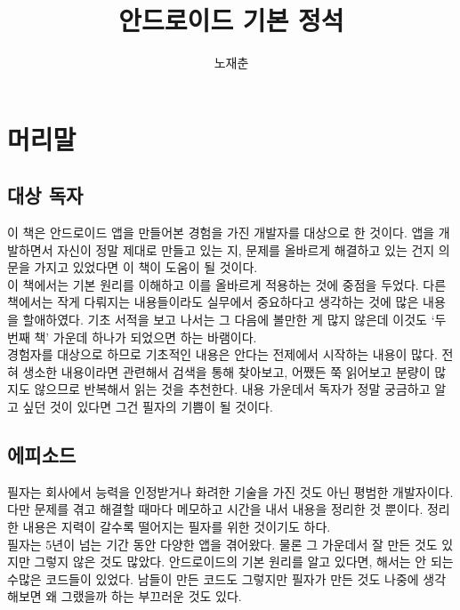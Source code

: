 \documentclass[a4paper,hidelinks,10pt,openany]{book} %
\title{안드로이드 기본 정석}
\author{노재춘}
\begin{document}

\maketitle
\chapter*{머리말}
\section{대상 독자}
이 책은 안드로이드 앱을 만들어본 경험을 가진 개발자를 대상으로 한 것이다. 
앱을 개발하면서 자신이 정말 제대로 만들고 있는 지, 문제를 올바르게 해결하고 있는 건지 의문을 가지고 있었다면 이 책이 도움이 될 것이다.\\

이 책에서는 기본 원리를 이해하고 이를 올바르게 적용하는 것에 중점을 두었다. 
다른 책에서는 작게 다뤄지는 내용들이라도 실무에서 중요하다고 생각하는 것에 많은 내용을 할애하였다.
기초 서적을 보고 나서는 그 다음에 볼만한 게 많지 않은데 이것도 `두 번째 책' 가운데 하나가 되었으면 하는 바램이다.\\

경험자를 대상으로 하므로 기초적인 내용은 안다는 전제에서 시작하는 내용이 많다. 
전혀 생소한 내용이라면 관련해서 검색을 통해 찾아보고, 어쨌든 쭉 읽어보고 분량이 많지도 않으므로 반복해서 읽는 것을 추천한다. 
내용 가운데서 독자가 정말 궁금하고 알고 싶던 것이 있다면 그건 필자의 기쁨이 될 것이다.

\section{에피소드}
필자는 회사에서 능력을 인정받거나 화려한 기술을 가진 것도 아닌 평범한 개발자이다. 
다만 문제를 겪고 해결할 때마다 메모하고 시간을 내서 내용을 정리한 것 뿐이다.
정리한 내용은 지력이 갈수록 떨어지는 필자를 위한 것이기도 하다.\\

필자는 5년이 넘는 기간 동안 다양한 앱을 겪어왔다. 물론 그 가운데서 잘 만든 것도 있지만 그렇지 않은 것도 많았다. 
안드로이드의 기본 원리를 알고 있다면, 해서는 안 되는 수많은 코드들이 있었다.
남들이 만든 코드도 그렇지만 필자가 만든 것도 나중에 생각해보면 왜 그랬을까 하는 부끄러운 것도 있다.\\
\end{document}
